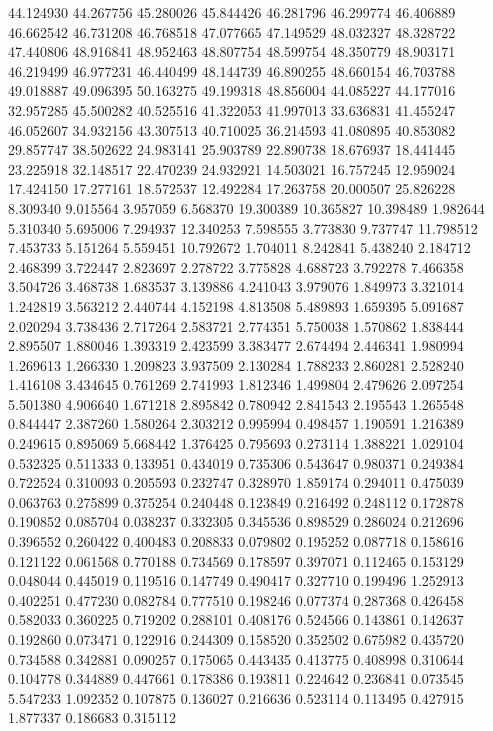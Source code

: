 44.124930
44.267756
45.280026
45.844426
46.281796
46.299774
46.406889
46.662542
46.731208
46.768518
47.077665
47.149529
48.032327
48.328722
47.440806
48.916841
48.952463
48.807754
48.599754
48.350779
48.903171
46.219499
46.977231
46.440499
48.144739
46.890255
48.660154
46.703788
49.018887
49.096395
50.163275
49.199318
48.856004
44.085227
44.177016
32.957285
45.500282
40.525516
41.322053
41.997013
33.636831
41.455247
46.052607
34.932156
43.307513
40.710025
36.214593
41.080895
40.853082
29.857747
38.502622
24.983141
25.903789
22.890738
18.676937
18.441445
23.225918
32.148517
22.470239
24.932921
14.503021
16.757245
12.959024
17.424150
17.277161
18.572537
12.492284
17.263758
20.000507
25.826228
8.309340
9.015564
3.957059
6.568370
19.300389
10.365827
10.398489
1.982644
5.310340
5.695006
7.294937
12.340253
7.598555
3.773830
9.737747
11.798512
7.453733
5.151264
5.559451
10.792672
1.704011
8.242841
5.438240
2.184712
2.468399
3.722447
2.823697
2.278722
3.775828
4.688723
3.792278
7.466358
3.504726
3.468738
1.683537
3.139886
4.241043
3.979076
1.849973
3.321014
1.242819
3.563212
2.440744
4.152198
4.813508
5.489893
1.659395
5.091687
2.020294
3.738436
2.717264
2.583721
2.774351
5.750038
1.570862
1.838444
2.895507
1.880046
1.393319
2.423599
3.383477
2.674494
2.446341
1.980994
1.269613
1.266330
1.209823
3.937509
2.130284
1.788233
2.860281
2.528240
1.416108
3.434645
0.761269
2.741993
1.812346
1.499804
2.479626
2.097254
5.501380
4.906640
1.671218
2.895842
0.780942
2.841543
2.195543
1.265548
0.844447
2.387260
1.580264
2.303212
0.995994
0.498457
1.190591
1.216389
0.249615
0.895069
5.668442
1.376425
0.795693
0.273114
1.388221
1.029104
0.532325
0.511333
0.133951
0.434019
0.735306
0.543647
0.980371
0.249384
0.722524
0.310093
0.205593
0.232747
0.328970
1.859174
0.294011
0.475039
0.063763
0.275899
0.375254
0.240448
0.123849
0.216492
0.248112
0.172878
0.190852
0.085704
0.038237
0.332305
0.345536
0.898529
0.286024
0.212696
0.396552
0.260422
0.400483
0.208833
0.079802
0.195252
0.087718
0.158616
0.121122
0.061568
0.770188
0.734569
0.178597
0.397071
0.112465
0.153129
0.048044
0.445019
0.119516
0.147749
0.490417
0.327710
0.199496
1.252913
0.402251
0.477230
0.082784
0.777510
0.198246
0.077374
0.287368
0.426458
0.582033
0.360225
0.719202
0.288101
0.408176
0.524566
0.143861
0.142637
0.192860
0.073471
0.122916
0.244309
0.158520
0.352502
0.675982
0.435720
0.734588
0.342881
0.090257
0.175065
0.443435
0.413775
0.408998
0.310644
0.104778
0.344889
0.447661
0.178386
0.193811
0.224642
0.236841
0.073545
5.547233
1.092352
0.107875
0.136027
0.216636
0.523114
0.113495
0.427915
1.877337
0.186683
0.315112
